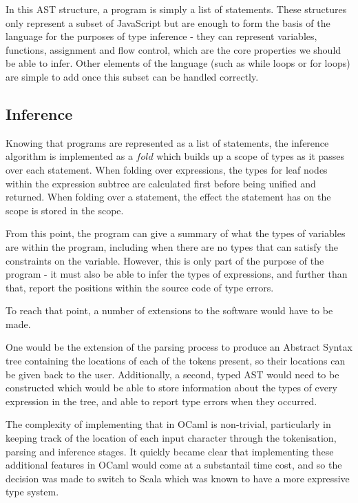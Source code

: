 \documentclass[british, twoside]{bhamthesis}
\theoremstyle{definition}
\begin{document}
      In this AST structure, a program is simply a list of statements. These structures only represent a subset of JavaScript but are enough to form the basis of the language for the purposes of type inference - they can represent variables, functions, assignment and flow control, which are the core properties we should be able to infer. Other elements of the language (such as while loops or for loops) are simple to add once this subset can be handled correctly.

    \subsection{Inference}
      Knowing that programs are represented as a list of statements, the inference algorithm is implemented as a $fold$ which builds up a scope of types as it passes over each statement. When folding over expressions, the types for leaf nodes within the expression subtree are calculated first before being unified and returned. When folding over a statement, the effect the statement has on the scope is stored in the scope.

      From this point, the program can give a summary of what the types of variables are within the program, including when there are no types that can satisfy the constraints on the variable. However, this is only part of the purpose of the program - it must also be able to infer the types of expressions, and further than that, report the positions within the source code of type errors.

      To reach that point, a number of extensions to the software would have to be made.

      One would be the extension of the parsing process to produce an Abstract Syntax tree containing the locations of each of the tokens present, so their locations can be given back to the user. Additionally, a second, typed AST would need to be constructed which would be able to store information about the types of every expression in the tree, and able to report type errors when they occurred.

      The complexity of implementing that in OCaml is non-trivial, particularly in keeping track of the location of each input character through the tokenisation, parsing and inference stages. It quickly became clear that implementing these additional features in OCaml would come at a substantail time cost, and so the decision was made to switch to Scala which was known to have a more expressive type system.
\end{document}

